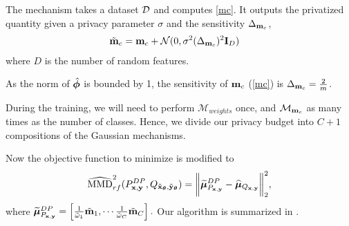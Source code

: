 \documentclass{article}
\begin{document}
\begin{defn}[$\mathcal{M}_{\vm_c}$]\label{defn:DP_mc}
The mechanism takes a dataset $\mathcal{D}$ and computes \eqref{mc}. It outputs the privatized quantity given a privacy parameter $\sigma$ and the sensitivity $\Delta_{\mathbf{m}_c}$, 
\begin{align}\label{eq:privatize_mc}
   \tilde{\mathbf{m}}_c &= \mathbf{m}_c + \mathcal{N}(0, \sigma^2 (\Delta_{\mathbf{m}_c})^2 \mathbf{I}_D)
\end{align} where $D$ is the number of random features.
\end{defn}  As the norm of $\hat{\mathbf{\bm{\phi}}}$ is bounded by 1, the sensitivity of $\mathbf{m}_c$ (\eqref{mc}) is $\Delta_{\mathbf{m}_c} = \frac{2}{m}$. 


During the training, we will need to perform $\mathcal{M}_{weights}$ once, and $\mathcal{M}_{\vm_c}$ as many times as the  number of classes. Hence, we divide our privacy budget into $C+1$ compositions of the Gaussian mechanisms. 



%
Now the objective function to minimize is modified to 
\begin{align}\label{eq:MMD_rf_joint_DP}
\widehat{\mathrm{MMD}}_{rf}^{2}(P_{\mathbf{x}, \mathbf{y}}^{DP}, Q_{\tilde{\mathbf{x}}_{\mathbf{\bm{\theta}}}, \tilde{\mathbf{y}}_{\mathbf{\bm{\theta}}}}) = \bigg\|\widetilde{\mathbf{\bm{\mu}}}^{DP}_{P_{\mathbf{x}, \mathbf{y}}}-\widehat{\mathbf{\bm{\mu}}}_{Q_{\mathbf{x}, \mathbf{y}}}\bigg\|_{2}^{2},
\end{align} where
$
 \widetilde{\mathbf{\bm{\mu}}}^{DP}_{P_{\mathbf{x}, \mathbf{y}}} = \left[\tfrac{1}{\tilde{\omega}_1} \tilde{\mathbf{m}}_1, \cdots \tfrac{1}{\tilde{\omega}_C} \tilde{\mathbf{m}}_C \right].
$
%
Our algorithm is summarized in .
\end{document}
